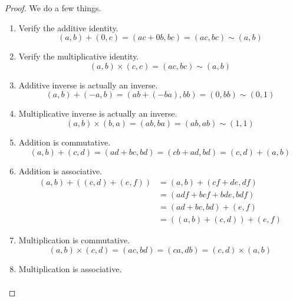     \begin{proof}
      We do a few things. 
      \begin{enumerate}
        \item Verify the additive identity. 
        \begin{equation}
          (a, b) + (0, c) = (ac + 0b, bc) = (ac, bc) \sim (a, b)
        \end{equation}
        \item Verify the multiplicative identity. 
        \begin{equation}
          (a, b) \times (c, c) = (ac, bc) \sim (a, b)
        \end{equation}
        \item Additive inverse is actually an inverse. 
        \begin{equation}
          (a, b) + (-a, b) = (ab + (-ba), bb) = (0, bb) \sim (0, 1)
        \end{equation}
        \item Multiplicative inverse is actually an inverse. 
        \begin{equation}
          (a, b) \times (b, a) = (ab, ba) = (ab, ab) \sim (1, 1)
        \end{equation}
        \item Addition is commutative. 
        \begin{equation}
          (a, b) + (c, d) = (ad + bc, bd) = (cb + ad, bd) = (c, d) + (a, b)
        \end{equation}
        \item Addition is associative. 
        \begin{align}
          (a, b) + ((c, d) + (e, f)) & = (a, b) + (cf + de, df) \\
                                     & = (adf + bcf + bde, bdf) \\
                                     & = (ad + bc, bd) + (e, f) \\
                                     & = ((a, b) + (c, d)) + (e, f)
        \end{align}
        \item Multiplication is commutative. 
        \begin{equation}
          (a, b) \times (c, d) = (ac, bd) = (ca, db) = (c, d) \times (a, b)
        \end{equation}
        \item Multiplication is associative. 
        \begin{align}

\end{align}
\end{enumerate}
\end{proof}
